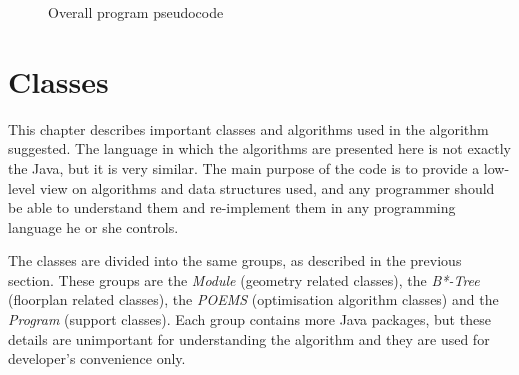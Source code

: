 \begin{figure}
\centering
\begin{algorithmic}[1]
      \ELSE
      \ENDIF
      \ENDIF
    \ENDFOR
    \ENDIF
  \ENDFOR
  \RETURN{$ \beta $}
\end{algorithmic}
\caption{Overall program pseudocode}
\label{fig:algorithm}
\end{figure}

\section{Classes}

This chapter describes important classes and algorithms used in the algorithm suggested. The language in which the algorithms are presented here is not exactly the Java, but it is very similar. The main purpose of the code is to provide a low-level view on algorithms and data structures used, and any programmer should be able to understand them and re-implement them in any programming language he or she controls.

The classes are divided into the same groups, as described in the previous section. These groups are the {\em Module} (geometry related classes), the {\em B*-Tree} (floorplan related classes), the {\em POEMS} (optimisation algorithm classes) and the {\em Program} (support classes). Each group contains more Java packages, but these details are unimportant for understanding the algorithm and they are used for developer's convenience only.

